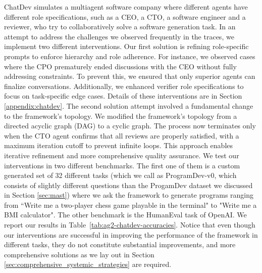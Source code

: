 ChatDev \cite{chatdev} simulates a multiagent software company where different agents have different role specifications, such as a CEO, a CTO, a software engineer and a reviewer, who try to collaboratively solve a software generation task. 
In an attempt to address the challenges we observed frequently in the traces, we implement two different interventions. 
Our first solution is refining role-specific prompts to enforce hierarchy and role adherence. 
For instance, we observed cases where the CPO prematurely ended discussions with the CEO without fully addressing constraints. 
To prevent this, we ensured that only superior agents can finalize conversations. 
Additionally, we enhanced verifier role specifications to focus on task-specific edge cases. 
Details of these interventions are in Section \ref{appendix:chatdev}.
The second solution attempt involved a fundamental change to the framework's topology. 
We modified the framework's topology from a directed acyclic graph (DAG) to a cyclic graph. 
The process now terminates only when the CTO agent confirms that all reviews are properly satisfied, with a maximum iteration cutoff to prevent infinite loops. 
This approach enables iterative refinement and more comprehensive quality assurance.
We test our interventions in two different benchmarks. The first one of them is a custom generated set of 32 different tasks (which we call as ProgramDev-v0, which consists of slightly different questions than the ProgamDev dataset we discussed in Section \ref{sec:mast}) where we ask the framework to generate programs ranging from ``Write me a two-player chess game playable in the terminal" to "Write me a BMI calculator". The other benchmark is the HumanEval task of OpenAI. We report our results in Table~\ref{tab:ag2-chatdev-accuracies}. Notice that even though our interventions are successful in improving the performance of the framework in different tasks, they do not constitute substantial improvements, and more comprehensive solutions as we lay out in Section \ref{sec:comprehensive_systemic_strategies} are required.

